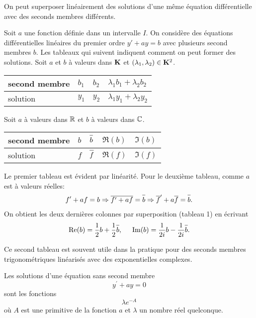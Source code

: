On peut superposer linéairement des solutions d'une même équation différentielle avec des seconds membres différents.
\begin{prop}[Superposition]
 Soit $a$ une fonction définie dans un intervalle $I$. On considère des équations différentielles linéaires du premier ordre $y' + ay = b$ avec plusieurs second membres $b$. Les tableaux qui suivent indiquent comment on peut former des solutions.\newline
 Soit $a$ et $b$ à valeurs dans $\K$ et $(\lambda_1, \lambda_2)\in \K^2$. 
\begin{center}
\renewcommand{\arraystretch}{1.2}
\begin{tabular}{|l|l|l|l|}
\hline
second membre & $b_1$ & $b_2$ & $\lambda_1 b_1 + \lambda_2 b_2$  \\ \hline
solution     & $y_1$ & $y_2$ & $\lambda_1 y_1 + \lambda_2 y_2$  \\ \hline
\end{tabular}
\end{center}
Soit $a$ à valeurs dans $\R$ et $b$ à valeurs dans $\C$.
\begin{center}
\renewcommand{\arraystretch}{1.4}
\begin{tabular}{|l|l|l|l|l|}
\hline
second membre & $b$ & $\overline{b\strut}$ & $\Re(b)$ & $\Im(b)$  \\ \hline
solution      & $f$ & $\overline{f\strut}$ & $\Re(f)$ & $\Im(f)$  \\ \hline
\end{tabular}
\end{center}
\end{prop}
\begin{demo}
 Le premier tableau est évident par linéarité. Pour le deuxième tableau, comme $a$ est à valeurs réelles:
\[
  f' + af = b \Rightarrow \overline{f' + af} = \overline{b\strut}
  \Rightarrow \overline{f}' + a \overline{f} = \overline{b\strut}.
\]
On obtient les deux dernières colonnes par superposition (tableau 1) en écrivant
\[
  \Re(b) = \frac{1}{2} b + \frac{1}{2}\overline{b\strut}, \hspace{0.5cm} \Im(b) = \frac{1}{2i} b - \frac{1}{2i}\overline{b\strut}.
\]
\end{demo}
\begin{rem}
 Ce second tableau est souvent utile dans la pratique pour des seconds membres trigonométriques linéarisés avec des exponentielles complexes.
\end{rem}


\begin{prop}
 Les solutions d'une équation sans second membre
\begin{equation*}
 y^\prime +  a y = 0
\end{equation*}
sont les fonctions
\begin{displaymath}
 \lambda e^{-A}
\end{displaymath}
où $A$ est une primitive de la fonction $a$ et $\lambda$ un nombre réel quelconque.
\end{prop}

